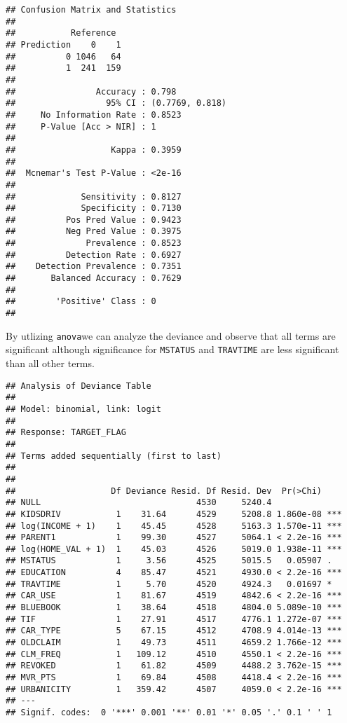 \documentclass[]{article}
\begin{document}
\begin{verbatim}
## Confusion Matrix and Statistics
## 
##           Reference
## Prediction    0    1
##          0 1046   64
##          1  241  159
##                                          
##                Accuracy : 0.798          
##                  95% CI : (0.7769, 0.818)
##     No Information Rate : 0.8523         
##     P-Value [Acc > NIR] : 1              
##                                          
##                   Kappa : 0.3959         
##                                          
##  Mcnemar's Test P-Value : <2e-16         
##                                          
##             Sensitivity : 0.8127         
##             Specificity : 0.7130         
##          Pos Pred Value : 0.9423         
##          Neg Pred Value : 0.3975         
##              Prevalence : 0.8523         
##          Detection Rate : 0.6927         
##    Detection Prevalence : 0.7351         
##       Balanced Accuracy : 0.7629         
##                                          
##        'Positive' Class : 0              
## 
\end{verbatim}

By utlizing \texttt{anova}we can analyze the deviance and observe that
all terms are significant although significance for \texttt{MSTATUS} and
\texttt{TRAVTIME} are less significant than all other terms.

\begin{verbatim}
## Analysis of Deviance Table
## 
## Model: binomial, link: logit
## 
## Response: TARGET_FLAG
## 
## Terms added sequentially (first to last)
## 
## 
##                   Df Deviance Resid. Df Resid. Dev  Pr(>Chi)    
## NULL                               4530     5240.4              
## KIDSDRIV           1    31.64      4529     5208.8 1.860e-08 ***
## log(INCOME + 1)    1    45.45      4528     5163.3 1.570e-11 ***
## PARENT1            1    99.30      4527     5064.1 < 2.2e-16 ***
## log(HOME_VAL + 1)  1    45.03      4526     5019.0 1.938e-11 ***
## MSTATUS            1     3.56      4525     5015.5   0.05907 .  
## EDUCATION          4    85.47      4521     4930.0 < 2.2e-16 ***
## TRAVTIME           1     5.70      4520     4924.3   0.01697 *  
## CAR_USE            1    81.67      4519     4842.6 < 2.2e-16 ***
## BLUEBOOK           1    38.64      4518     4804.0 5.089e-10 ***
## TIF                1    27.91      4517     4776.1 1.272e-07 ***
## CAR_TYPE           5    67.15      4512     4708.9 4.014e-13 ***
## OLDCLAIM           1    49.73      4511     4659.2 1.766e-12 ***
## CLM_FREQ           1   109.12      4510     4550.1 < 2.2e-16 ***
## REVOKED            1    61.82      4509     4488.2 3.762e-15 ***
## MVR_PTS            1    69.84      4508     4418.4 < 2.2e-16 ***
## URBANICITY         1   359.42      4507     4059.0 < 2.2e-16 ***
## ---
## Signif. codes:  0 '***' 0.001 '**' 0.01 '*' 0.05 '.' 0.1 ' ' 1
\end{verbatim}
\end{document}
